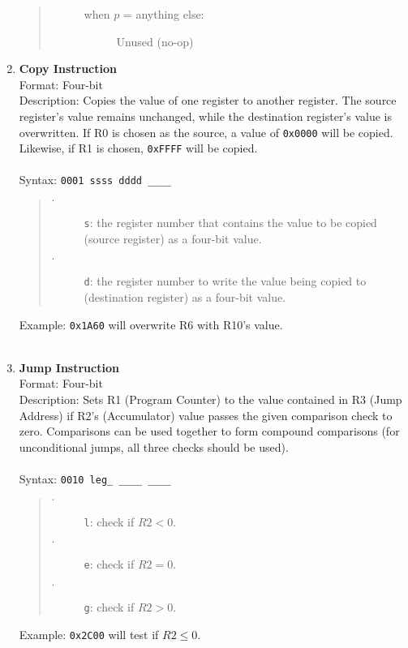 \documentclass{article}
\begin{document}
\begin{enumerate}
\begin{quote}
\begin{description}
\begin{description}
							\item[when $p$ = anything else:] Unused (no-op)
								
						\end{description}
					\end{description}
				\end{quote}
			
			\vskip 0.2in
			
			\item \textbf{Copy Instruction}\\
			Format: Four-bit\\
			Description: Copies the value of one register to another register. The source register's value remains unchanged, while the destination register's value is overwritten. If R0 is chosen as the source, a value of \texttt{0x0000} will be copied. Likewise, if R1 is chosen, \texttt{0xFFFF} will be copied.\\
			\\
			Syntax: \texttt{0001 ssss dddd \_\_\_\_}
			\begin{quote}
				\begin{description}
					\item[$\cdot$] \texttt{s}: the register number that contains the value to be copied (source register) as a four-bit value.
					\item[$\cdot$] \texttt{d}: the register number to write the value being copied to (destination register) as a four-bit value.
				\end{description}
			\end{quote}
			Example: \texttt{0x1A60} will overwrite R6 with R10's value.\\
			\\
			
			\item \textbf{Jump Instruction}\\
			Format: Four-bit\\
			Description: Sets R1 (Program Counter) to the value contained in R3 (Jump Address) if R2's (Accumulator) value passes the given comparison check to zero. Comparisons can be used together to form compound comparisons (for unconditional jumps, all three checks should be used).\\
			\\
			Syntax: \texttt{0010 leg\_ \_\_\_\_ \_\_\_\_}
			\begin{quote}
				\begin{description}
					\item[$\cdot$] \texttt{l}: check if $R2 < 0$.
					\item[$\cdot$] \texttt{e}: check if $R2 = 0$.
					\item[$\cdot$] \texttt{g}: check if $R2 > 0$.
				\end{description}
			\end{quote}
			Example: \texttt{0x2C00} will test if $R2 \leq 0$.\\
			\\
			

\end{enumerate}
\end{document}

